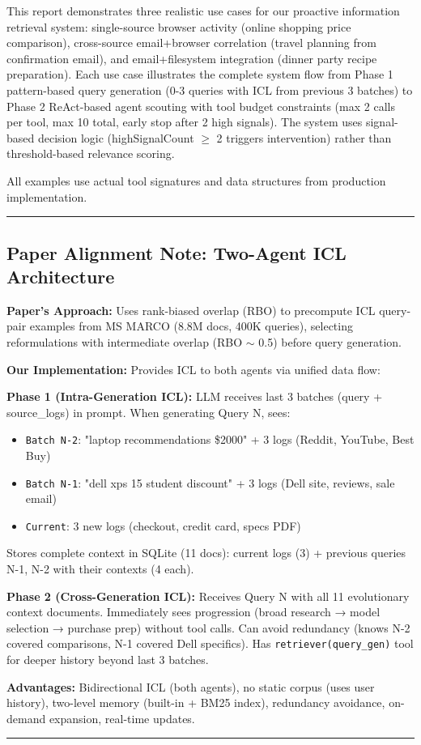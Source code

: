 \documentclass[11pt,a4paper]{article}
\begin{document}
This report demonstrates three realistic use cases for our proactive information retrieval system: single-source browser activity (online shopping price comparison), cross-source email+browser correlation (travel planning from confirmation email), and email+filesystem integration (dinner party recipe preparation). Each use case illustrates the complete system flow from Phase 1 pattern-based query generation (0-3 queries with ICL from previous 3 batches) to Phase 2 ReAct-based agent scouting with tool budget constraints (max 2 calls per tool, max 10 total, early stop after 2 high signals). The system uses signal-based decision logic (highSignalCount $\geq$ 2 triggers intervention) rather than threshold-based relevance scoring.

All examples use actual tool signatures and data structures from production implementation.

\vspace{0.5cm}
\noindent\rule{\textwidth}{0.4pt}
\subsection*{Paper Alignment Note: Two-Agent ICL Architecture}

\textbf{Paper's Approach:} Uses rank-biased overlap (RBO) to precompute ICL query-pair examples from MS MARCO (8.8M docs, 400K queries), selecting reformulations with intermediate overlap (RBO $\sim$ 0.5) before query generation.

\textbf{Our Implementation:} Provides ICL to both agents via unified data flow:

\textbf{Phase 1 (Intra-Generation ICL):} LLM receives last 3 batches (query + source\_logs) in prompt. When generating Query N, sees:
\begin{itemize}
    \item \texttt{Batch N-2}: "laptop recommendations \$2000" + 3 logs (Reddit, YouTube, Best Buy)
    \item \texttt{Batch N-1}: "dell xps 15 student discount" + 3 logs (Dell site, reviews, sale email)
    \item \texttt{Current}: 3 new logs (checkout, credit card, specs PDF)
\end{itemize}

Stores complete context in SQLite (11 docs): current logs (3) + previous queries N-1, N-2 with their contexts (4 each).

\textbf{Phase 2 (Cross-Generation ICL):} Receives Query N with all 11 evolutionary context documents. Immediately sees progression (broad research → model selection → purchase prep) without tool calls. Can avoid redundancy (knows N-2 covered comparisons, N-1 covered Dell specifics). Has \texttt{retriever(query\_gen)} tool for deeper history beyond last 3 batches.

\textbf{Advantages:} Bidirectional ICL (both agents), no static corpus (uses user history), two-level memory (built-in + BM25 index), redundancy avoidance, on-demand expansion, real-time updates.

\noindent\rule{\textwidth}{0.4pt}
\end{document}

